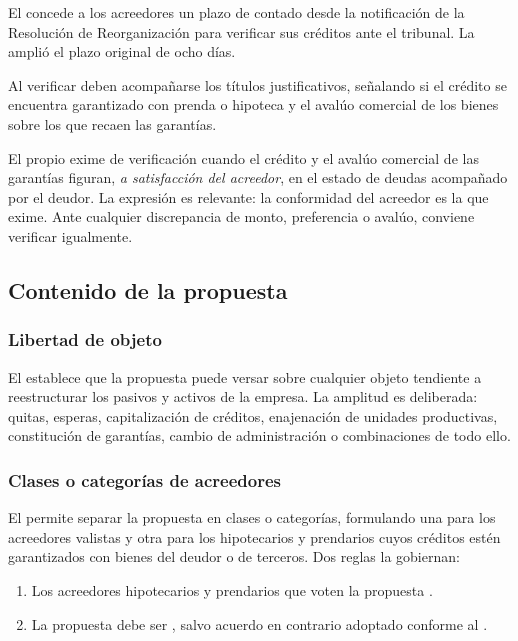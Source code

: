 El  concede a los acreedores un plazo de  contado desde la
notificación de la Resolución de Reorganización para verificar sus créditos ante el
tribunal. La \Lreforma{} amplió el plazo original de ocho días.

Al verificar deben acompañarse los títulos justificativos, señalando si el crédito se
encuentra garantizado con prenda o hipoteca y el avalúo comercial de los bienes sobre los
que recaen las garantías.

\begin{practica}
El propio  exime de verificación cuando el crédito y el avalúo comercial de las
garantías figuran, \emph{a satisfacción del acreedor}, en el estado de deudas acompañado por
el deudor. La expresión es relevante: la conformidad del acreedor es la que exime. Ante
cualquier discrepancia de monto, preferencia o avalúo, conviene verificar igualmente.
\end{practica}

\subsection{Contenido de la propuesta}

\subsubsection{Libertad de objeto}

El  establece que la propuesta puede versar sobre cualquier objeto tendiente a
reestructurar los pasivos y activos de la empresa. La amplitud es deliberada: quitas,
esperas, capitalización de créditos, enajenación de unidades productivas, constitución de
garantías, cambio de administración o combinaciones de todo ello.

\subsubsection{Clases o categorías de acreedores}

El  permite separar la propuesta en clases o categorías, formulando una para los
acreedores valistas y otra para los hipotecarios y prendarios cuyos créditos estén
garantizados con bienes del deudor o de terceros. Dos reglas la gobiernan:

\begin{enumerate}
  \item Los acreedores hipotecarios y prendarios que voten la propuesta .
  \item La propuesta debe ser , salvo acuerdo en contrario adoptado conforme al .
\end{enumerate}

